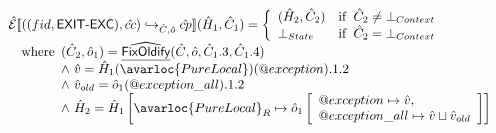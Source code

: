 \[\begin{array}{l}
\aE \lbr ((fid,\SF{EXIT-EXC}),\hat{cc}) \cfgnext_{\hat{C},\hat{o}} \acp \rbr (\hat{H}_1,\hat{C}_1) =
  \left\{
    \begin{array}{ll}
      (\hat{H}_2, \hat{C}_2) & \ifc{\hat{C}_2 \neq \bot_{Context}} \\
      \bot_{State} & \ifc{\hat{C}_2 = \bot_{Context}} \\
    \end{array}
  \right.\\
  \quad\wherec{
    (\hat{C}_2, \hat{o}_1) = \ahf{FixOldify}(\hat{C}, \hat{o}, \hat{C}_1.3, \hat{C}_1.4) \\ 
    \land\ \hat{v} = \hat{H}_1(\avarloc{PureLocal})(\varprop{exception}).1.2 \\
    \land\ \hat{v}_{old} = \hat{o}_1(\varprop{exception\_all}).1.2 \\
    \land\ \hat{H}_2 = \hat{H}_1\left[\avarloc{PureLocal}_R \mapsto \hat{o}_1
      \left[\begin{array}{l}
        \varprop{exception} \mapsto \hat{v}, \\
        \varprop{exception\_all} \mapsto \hat{v} \sqcup \hat{v}_{old}
      \end{array}\right]\right]
  }
\\\\

\end{array}
\]
